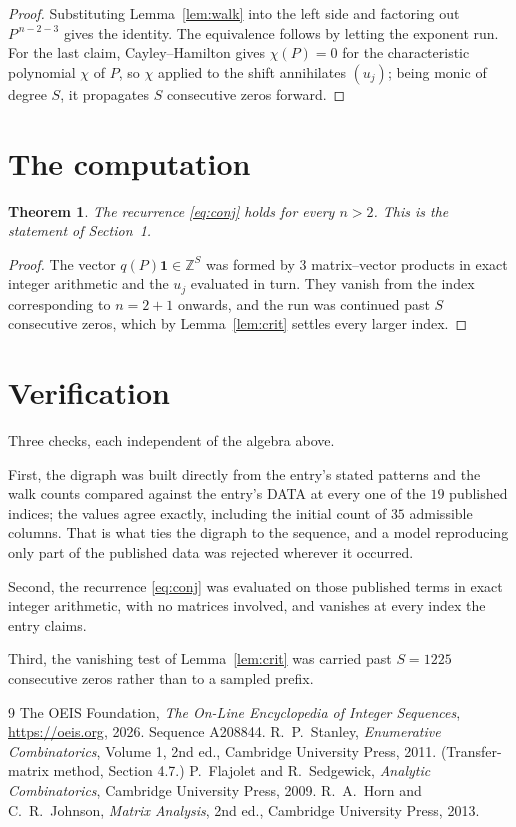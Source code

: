 \documentclass[11pt,a4paper]{article}
\theoremstyle{plain}
\newtheorem{theorem}{Theorem}
\theoremstyle{definition}
\begin{document}
\begin{proof}
Substituting Lemma~\ref{lem:walk} into the left side and factoring out
$P^{\,n-2-3}$ gives the identity. The equivalence follows by letting the exponent
run. For the last claim, Cayley--Hamilton gives $\chi(P)=0$ for the characteristic
polynomial $\chi$ of $P$, so $\chi$ applied to the shift annihilates $(u_j)$; being monic of
degree $S$, it propagates $S$ consecutive zeros forward.
\end{proof}

\section{The computation}

\begin{theorem}
The recurrence \eqref{eq:conj} holds for every $n>2$. This is the statement of
Section~1.
\end{theorem}

\begin{proof}
The vector $q(P)\mathbf{1}\in\mathbb{Z}^{S}$ was formed by $3$ matrix--vector
products in exact integer arithmetic and the $u_j$ evaluated in turn. They vanish from the
index corresponding to $n=2+1$ onwards, and the run was continued past $S$ consecutive
zeros, which by Lemma~\ref{lem:crit} settles every larger index.
\end{proof}

\section{Verification}

Three checks, each independent of the algebra above.

First, the digraph was built directly from the entry's stated patterns and the walk counts
compared against the entry's DATA at every one of the $19$ published indices; the
values agree exactly, including the initial count of $35$ admissible columns. That is
what ties the digraph to the sequence, and a model reproducing only part of the published
data was rejected wherever it occurred.

Second, the recurrence \eqref{eq:conj} was evaluated on those published terms in exact
integer arithmetic, with no matrices involved, and vanishes at every index the entry claims.

Third, the vanishing test of Lemma~\ref{lem:crit} was carried past $S=1225$ consecutive
zeros rather than to a sampled prefix.

\begin{thebibliography}{9}
 The OEIS Foundation, \emph{The On-Line Encyclopedia of Integer
Sequences}, \url{https://oeis.org}, 2026. Sequence A208844.
 R.~P.~Stanley, \emph{Enumerative Combinatorics}, Volume 1, 2nd ed.,
Cambridge University Press, 2011. (Transfer-matrix method, Section 4.7.)
 P.~Flajolet and R.~Sedgewick, \emph{Analytic Combinatorics}, Cambridge
University Press, 2009.
 R.~A.~Horn and C.~R.~Johnson, \emph{Matrix Analysis}, 2nd ed., Cambridge
University Press, 2013.
\end{thebibliography}
\end{document}
